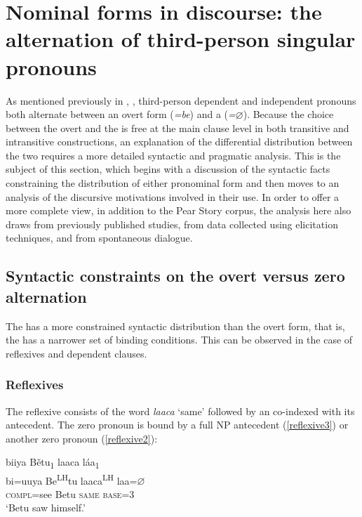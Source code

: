 \chapter[]{Nominal forms in discourse: the alternation of third-person singular pronouns}\label{alternation}
As mentioned previously in , , third-person dependent and independent pronouns both alternate between an overt form (\textit{=be}) and a  (\textit{=$\varnothing$}). Because the choice between the overt and the  is free at the main clause level in both transitive and intransitive constructions, an explanation of the differential distribution between the two requires a more detailed syntactic and pragmatic analysis. This is the subject of this section, which begins with a discussion of the syntactic facts constraining the distribution of either pronominal form and then moves to an analysis of the discursive motivations involved in their use. In order to offer a more complete view, in addition to the Pear Story corpus, the analysis here also draws from previously published studies, from data collected using elicitation techniques, and from spontaneous dialogue. 


\section{Syntactic constraints on the overt versus zero alternation}

The  has a more constrained syntactic distribution than the overt form, that is, the  has a narrower set of binding conditions. This can be observed in the case of reflexives and dependent clauses. 


\subsection{Reflexives}

The reflexive consists of the word \textit{laaca} `same' followed by an  co-indexed with its antecedent. The zero pronoun is bound by a full NP antecedent (\ref{reflexive3}) or another zero pronoun (\ref{reflexive2}): 

\ea\label{reflexive3}
\glll biiya B\v{e}tu\textsubscript{1} laaca l\'{a}a\textsubscript{1} \\
bi=uuya Be\textsuperscript{LH}tu laaca\textsuperscript{LH} laa={$\varnothing$} \\
\textsc{compl}=see Betu \textsc{same} \textsc{base}=\textsc{3} \\
\glt `Betu saw himself.' 
\z

